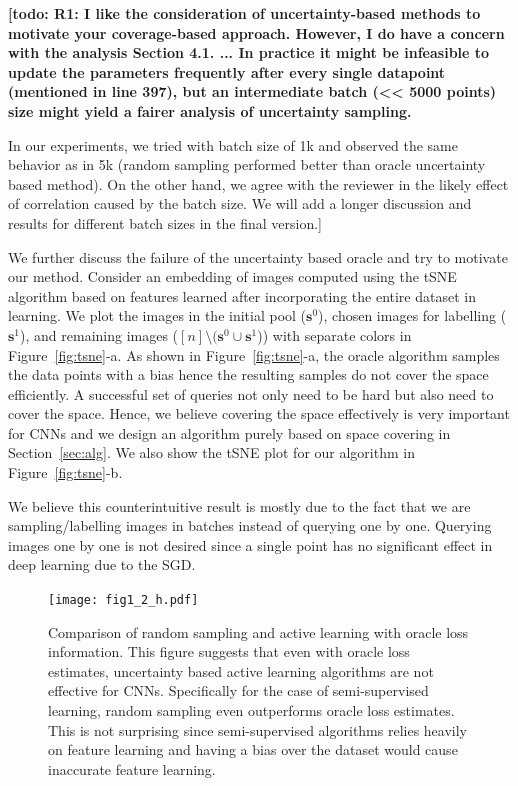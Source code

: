 \documentclass{article}
\newcommand{\todo}[1]{{\bf \color{red}[todo: #1]}}
\begin{document}
\todo{R1: I like the consideration of uncertainty-based methods to motivate your coverage-based approach. However, I do have a concern with the analysis Section 4.1. ... In practice it might be infeasible to update the parameters frequently after every single datapoint (mentioned in line 397), but an intermediate batch (<< 5000 points) size might yield a fairer analysis of uncertainty sampling.

In our experiments, we tried with batch size of 1k and observed the same behavior as in 5k (random sampling performed better than oracle uncertainty based method). On the other hand, we agree with the reviewer in the likely effect of correlation caused by the batch size. We will add a longer discussion and results for different batch sizes in the final version.}

We further discuss the failure of the uncertainty based oracle and try to motivate our method. Consider an embedding of images computed using the tSNE\cite{tsne} algorithm based on features learned after incorporating the entire dataset in learning. We plot the images in the initial pool ($\mathbf{s}^0$), chosen images for labelling ($\mathbf{s}^1$), and remaining images ($[n] \setminus (\mathbf{s}^0 \cup \mathbf{s}^1$)) with separate colors in Figure~\ref{fig:tsne}-a. As shown in Figure~\ref{fig:tsne}-a, the oracle algorithm samples the data points with a bias hence the resulting samples do not cover the space efficiently. A successful set of queries not only need to be hard but also need to cover the space. Hence, we believe covering the space effectively is very important for CNNs and we design an algorithm purely based on space covering in Section~\ref{sec:alg}. We also show the tSNE plot for our algorithm in Figure~\ref{fig:tsne}-b.

We believe this counterintuitive result is mostly due to the fact that we are sampling/labelling images in batches instead of querying one by one. Querying images one by one is not desired since a single point has no significant effect in deep learning due to the SGD. 

\begin{figure}[t]
\vspace{-3mm}
\texttt{[image: fig1\_2\_h.pdf]}
\vspace{-5mm}
\caption{Comparison of random sampling and active learning with oracle loss information. This figure suggests that even with oracle loss estimates, uncertainty based active learning algorithms are not effective for CNNs. Specifically for the case of semi-supervised learning, random sampling even outperforms oracle loss estimates. This is not surprising since semi-supervised algorithms relies heavily on feature learning and having a bias over the dataset would cause inaccurate feature learning.}
\label{fig:neg}
\end{figure}
\end{document}
